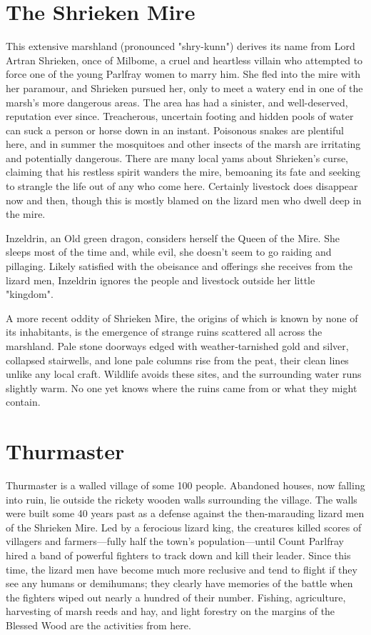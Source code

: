 \documentclass[letterpaper,twocolumn,openany,nodeprecatedcode,bg=full]{dndbook}
\begin{document}
\section{The Shrieken Mire}
This extensive marshland (pronounced "shry-kunn") derives its name from Lord Artran Shrieken, once of Milbome, a cruel and heartless villain who attempted to force one of the young Parlfray women to marry him. She fled into the mire with her paramour, and Shrieken pursued her, only to meet a watery end in one of the marsh's more dangerous areas. The area has had a sinister, and well-deserved, reputation ever since. Treacherous, uncertain footing and hidden pools of water can suck a person or horse down in an instant. Poisonous snakes are plentiful here, and in summer the mosquitoes and other insects of the marsh are irritating and potentially dangerous. There are many local yams about Shrieken's curse, claiming that his restless spirit wanders the mire, bemoaning its fate and seeking to strangle the life out of any who come here. Certainly livestock does disappear now and then, though this is mostly blamed on the lizard men who dwell deep in the mire.

Inzeldrin, an Old green dragon, considers herself the Queen of the Mire. She sleeps most of the time and, while evil, she doesn't seem to go raiding and pillaging. Likely satisfied with the obeisance and offerings she receives from the lizard men, Inzeldrin ignores the people and livestock outside her little "kingdom".

A more recent oddity of Shrieken Mire, the origins of which is known by none of its inhabitants, is the emergence of strange ruins scattered all across the marshland. Pale stone doorways edged with weather‑tarnished gold and silver, collapsed stairwells, and lone pale columns rise from the peat, their clean lines unlike any local craft. Wildlife avoids these sites, and the surrounding water runs slightly warm. No one yet knows where the ruins came from or what they might contain.

\section{Thurmaster}
Thurmaster is a walled village of some 100 people. Abandoned houses, now falling into ruin, lie outside the rickety wooden walls surrounding the village. The walls were built some 40 years past as a defense against the then-marauding lizard men of the Shrieken Mire. Led by a ferocious lizard king, the creatures killed scores of villagers and farmers—fully half the town's population—until Count Parlfray hired a band of powerful fighters to track down and kill their leader. Since this time, the lizard men have become much more reclusive and tend to flight if they see any humans or demihumans; they clearly have memories of the battle when the fighters wiped out nearly a hundred of their number. Fishing, agriculture, harvesting of marsh reeds and hay, and light forestry on the margins of the Blessed Wood are the activities from here.
\end{document}
